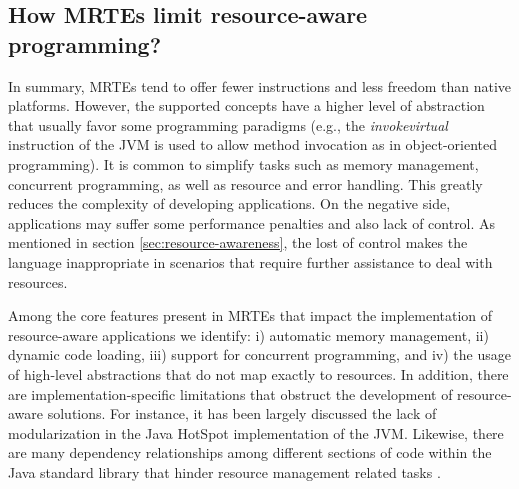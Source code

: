 \subsection{How MRTEs limit resource-aware programming?}

In summary, MRTEs tend to offer fewer instructions and less freedom than native platforms.
However, the supported concepts have a higher level of abstraction that usually favor some programming paradigms (e.g., the \textit{invokevirtual} instruction of the JVM is used to allow method invocation as in object-oriented programming).
It is common to simplify tasks such as memory management, concurrent programming, as well as resource and error handling.
This greatly reduces the complexity of developing applications.
On the negative side, applications may suffer some performance penalties and also lack of control.
As mentioned in section \ref{sec:resource-awareness}, the lost of control makes the language inappropriate in scenarios that require further assistance to deal with resources.

Among the core features present in MRTEs that impact the implementation of resource-aware applications we identify: i) automatic memory management, ii) dynamic code loading, iii) support for concurrent programming, and iv) the usage of high-level abstractions that do not map exactly to resources.
In addition, there are implementation-specific limitations that obstruct the development of resource-aware solutions.
For instance, it has been largely discussed \cite{} the lack of modularization in the Java HotSpot implementation of the JVM.
Likewise, there are many dependency relationships among different sections of code within the Java standard library that hinder resource management related tasks \cite{moxi, binder}.

\begin{comment}

Esta seccion sencillamente presenta las principales caracteristicas de un ambiente de ejecucion manejado.
Esta es una seccion de background donde sencillamente se establecen las caracteristicas de estos sistemas con las que tenemos que lidiar y que repercuten en las decisiones que tomamos en nuestro trabajo.

Por ejemplo, debemos discutir como en MRTEs se esconde intencionalmente el aspecto de manejo de recursos para facilitar el desarrollo de aplicaciones.

Discutir en particular la cuestion de la memoria.

Discutir las ideas de carga dinamica de codigo y commo esto se puede usar para cosas buenas como crear component framewroks pero complica las cosas porque ya no se cumplen las condiciones de mundo cerrado.

Esta es una seccion informativo, es util para poner al lector en contexto y para que pueda comprender elementos que vienen a continuacion.

Su longitud estimada es de 1 a 2 paginas.

\end{comment}


